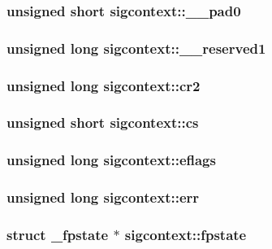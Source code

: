 \subsubsection[{\_\-\_\-pad0}]{\setlength{\rightskip}{0pt plus 5cm}unsigned short {\bf sigcontext::\_\-\_\-pad0}}\label{structsigcontext_a7c2e532bc6a202c2e1c1dbd06993365d}
\subsubsection[{\_\-\_\-reserved1}]{\setlength{\rightskip}{0pt plus 5cm}unsigned long {\bf sigcontext::\_\-\_\-reserved1}}\label{structsigcontext_a48ea48a9e500e0c4bb6c2cc86c8738ce}
\subsubsection[{cr2}]{\setlength{\rightskip}{0pt plus 5cm}unsigned long {\bf sigcontext::cr2}}\label{structsigcontext_ad33bfe87b82bed38f9b2e938c7ed5355}
\subsubsection[{cs}]{\setlength{\rightskip}{0pt plus 5cm}unsigned short {\bf sigcontext::cs}}\label{structsigcontext_a955e873310dbf0e819660f25f3b1ea77}
\subsubsection[{eflags}]{\setlength{\rightskip}{0pt plus 5cm}unsigned long {\bf sigcontext::eflags}}\label{structsigcontext_ab79b0273c20fd330324964bb75fb5485}
\subsubsection[{err}]{\setlength{\rightskip}{0pt plus 5cm}unsigned long {\bf sigcontext::err}}\label{structsigcontext_a0082bfad70e1abe39649f3720a3ad877}
\subsubsection[{fpstate}]{\setlength{\rightskip}{0pt plus 5cm}struct {\bf \_\-fpstate} $\ast$ {\bf sigcontext::fpstate}}\label{structsigcontext_aee2561af99d755170a830e73954e0ee2}

